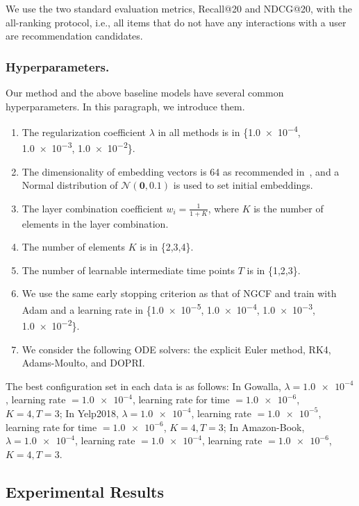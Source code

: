 \documentclass[sigconf]{acmart}
\begin{document}
We use the two standard evaluation metrics, Recall@20 and NDCG@20, with the all-ranking protocol, i.e., all items that do not have any interactions with a user are recommendation candidates.

\subsubsection{Hyperparameters.} Our method and the above baseline models have several common hyperparameters. In this paragraph, we introduce them.
\begin{enumerate}
\item The regularization coefficient $\lambda$ in all methods is in \{\num{1.0e-4}, \num{1.0e-3}, \num{1.0e-2}\}.
\item The dimensionality of embedding vectors is 64 as recommended in~\cite{10.1145/3397271.3401063}, and a Normal distribution of $\mathcal{N}(\bm{0}, \bm{0.1})$ is used to set initial embeddings.
\item The layer combination coefficient $w_i = \frac{1}{1+K}$, where $K$ is the number of elements in the layer combination.
\item The number of elements $K$ is in \{2,3,4\}.
\item The number of learnable intermediate time points $T$ is in \{1,2,3\}.
\item We use the same early stopping criterion as that of NGCF and train with Adam and a learning rate in \{\num{1.0e-5}, \num{1.0e-4}, \num{1.0e-3}, \num{1.0e-2}\}.
\item We consider the following ODE solvers: the explicit Euler method, RK4, Adams-Moulto, and DOPRI.
\end{enumerate}

The best configuration set in each data is as follows: In Gowalla, $\lambda=\num{1.0e-4}$, learning rate $=\num{1.0e-4}$, learning rate for time $=\num{1.0e-6}$, $K=4, T=3$; In Yelp2018, $\lambda=\num{1.0e-4}$, learning rate $=\num{1.0e-5}$, learning rate for time $=\num{1.0e-6}$,  $K=4, T=3$; In Amazon-Book, $\lambda=\num{1.0e-4}$, learning rate $=\num{1.0e-4}$, learning rate $=\num{1.0e-6}$, $K=4, T=3$.






\subsection{Experimental Results}
\end{document}
